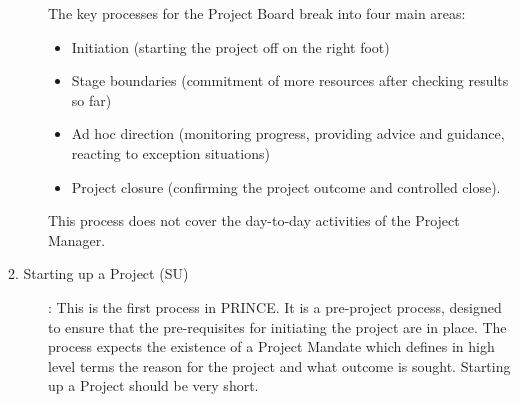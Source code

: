 \begin{minipage}[t]{0.5\linewidth}
\begin{description}
The key processes for the Project Board break into four main areas:
\begin{itemize}
\item Initiation (starting the project off on the right foot)
\item Stage boundaries (commitment of more resources after checking results so
  far)
\item Ad hoc direction (monitoring progress, providing advice and guidance,
  reacting to exception situations)
\item Project closure (confirming the project outcome and controlled close).
\end{itemize}
This process does not cover the day-to-day activities of the Project Manager.
%
\ifslides
\newpage
\fi
\item [2. Starting up a Project (SU)]:
This is the first process in PRINCE. It is a pre-project process, designed to
ensure that the pre-requisites for initiating the project are in place. The
process expects the existence of a Project Mandate which defines in high level
terms the reason for the project and what outcome is sought. Starting up a
Project should be very short.


\end{description}
\end{minipage}
